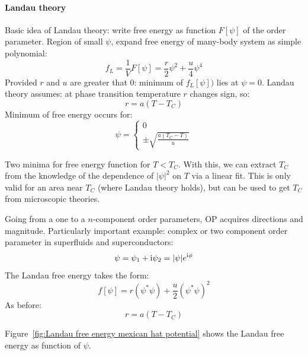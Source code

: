 \documentclass[../notes.tex]{subfiles}
\begin{document}
\paragraph{Landau theory}

Basic idea of Landau theory: write free energy as function \(F[\psi]\) of the order parameter.
Region of small \(\psi\), expand free energy of many-body system as simple polynomial:
\begin{equation}
	f_{L} = \frac{1}{V} F[\psi] = \frac{r}{2} \psi^2 + \frac{u}{4} \psi^4
\end{equation}
Provided \(r\) and \(u\) are greater that \(0\): minimum of \(f_L [\psi])\) lies at \(\psi = 0\).
Landau theory assumes: at phase transition temperature \(r\) changes sign, so:
\begin{equation}
	r = a(T - T_C)
\end{equation}
Minimum of free energy occurs for:
\begin{equation}
	\psi = \begin{cases}
		0 \\
		\pm \sqrt{\frac{a (T_C - T)}{u} }
	\end{cases}
\end{equation}

Two minima for free energy function for \(T < T_C\).
With this, we can extract \(T_C\) from the knowledge of the dependence of \(\vert \psi \vert^2\) on \(T\) via a linear fit.
This is only valid for an area near \(T_C\) (where Landau theory holds), but can be used to get \(T_C\) from microscopic theories.

Going from a one to a \(n\)-component order parameters, OP acquires directions and magnitude.
Particularly important example: complex or two component order parameter in superfluids and superconductors:
\begin{equation}
	\psi = \psi_1 + \mathrm{i} \psi_2 = \vert \psi \vert e^{\mathrm{i} \phi}
\end{equation}
The Landau free energy takes the form:
\begin{equation}
	f[\psi] = r(\psi^* \psi) + \frac{u}{2} (\psi^* \psi)^2
\end{equation}
As before:
\begin{equation}
	r = a(T - T_C)
\end{equation}

Figure~\ref{fig:Landau free energy mexican hat potential} shows the Landau free energy as function of \(\psi\).
\end{document}

